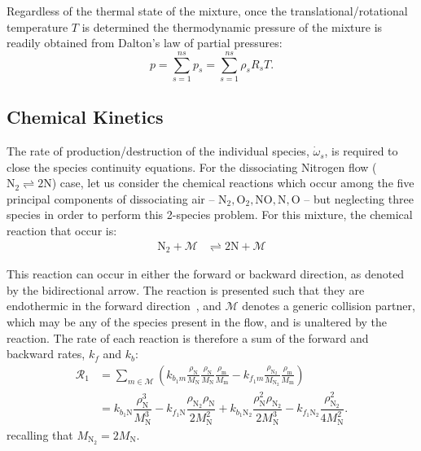 \documentclass[10pt]{article}
\begin{document}
Regardless of the thermal state of the mixture, once the translational/rotational temperature $T$ is determined the thermodynamic pressure of the mixture is readily obtained from Dalton's law of partial pressures:
\begin{equation}
 p = \sum_{s=1}^{ns} p_s = \sum_{s=1}^{ns} \rho_s R_s T .
 \label{eq:p_eq_state}
\end{equation}


\subsection{Chemical Kinetics}
The rate of production/destruction of the individual species, $\dot{\omega}_s$, is required to close the species continuity equations. For the dissociating Nitrogen flow ($\text{N}_2 \rightleftharpoons 2\text{N}$) case, let us consider the chemical reactions which occur among the five principal components of dissociating air -- $\text{N}_2,\text{O}_2,\text{NO},\text{N},\text{O}$ -- but neglecting three species in order to perform this 2-species problem. For this mixture, the chemical reaction that occur is:
\begin{align*}
 \text{N}_2 + \mathcal{M} &\rightleftharpoons 2\text{N} + \mathcal{M} 
\end{align*}

This reaction can occur in either the forward or backward direction, as denoted by the bidirectional arrow. The reaction is presented such that they are endothermic in the forward direction~\citep{Kirk2009}, and $\mathcal{M}$ denotes a generic collision partner, which may be any of the species present in the flow, and is  unaltered by the reaction.
The rate of each reaction is therefore a sum of the forward and backward rates,  $k_{f}$ and $k_{b}$:
\begin{align*}
 \mathcal{R}_1 &= \sum_{m\in\mathcal{M}}\left(k_{b_1 m} \frac{\rho_{\text{N}}}{M_{\text{N}}}\frac{\rho_{\text{N}}}{M_{\text{N}}}\frac{\rho_{\text{m}}}{M_{\text{m}}} - k_{f_1 m}\frac{\rho_{\text{N}_2}}{M_{\text{N}_2}}\frac{\rho_{\text{m}}}{M_{\text{m}}} \right) \\
%
&= k_{b_1 \text{N}} \dfrac{\rho_{\text{N}}^3}{M_\text{N}^3} -
k_{f_1 \text{N}}   \dfrac{\rho_{\text{N}_2} \rho_{\text{N}}}{2  M_\text{N}^2}+
k_{b_1 \text{N}_2} \dfrac{\rho_\text{N}^2 \rho_{\text{N}_2}}{2M_\text{N}^3 }-
k_{f_1 \text{N}_2} \dfrac{\rho_{\text{N}_2}^2}{4 M_\text{N}^2}.
\end{align*}
recalling that $M_{\text{N}_2}=2 M_\text{N}.$
\end{document}
